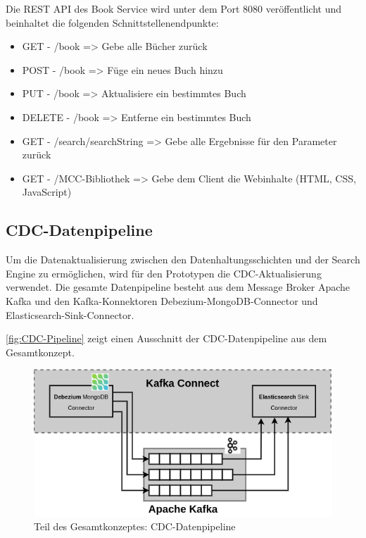 Die REST API des Book Service wird unter dem Port 8080 veröffentlicht und beinhaltet die folgenden Schnittstellenendpunkte:

\begin{itemize}
    \item GET - \glqq /book\grqq{} => Gebe alle Bücher zurück
    \item POST - \glqq /book\grqq{} => Füge ein neues Buch hinzu
    \item PUT - \glqq /book\grqq{} => Aktualisiere ein bestimmtes Buch
    \item DELETE - \glqq /book\grqq{} => Entferne ein bestimmtes Buch
    \item GET - \glqq /search/{searchString}\grqq{} => Gebe alle Ergebnisse für den Parameter zurück
    \item GET - \glqq /MCC-Bibliothek\grqq{} => Gebe dem Client die Webinhalte (HTML, CSS, JavaScript)
\end{itemize}

\subsection{CDC-Datenpipeline\label{sec5.2.2:Unterunterpunkt-2}}

Um die Datenaktualisierung zwischen den Datenhaltungsschichten und der Search Engine zu ermöglichen, wird für den Prototypen die CDC-Aktualisierung verwendet. Die gesamte Datenpipeline besteht aus dem Message Broker \glqq Apache Kafka\grqq{} und den Kafka-Konnektoren \glqq Debezium-MongoDB-Connector\grqq{} und \glqq Elasticsearch-Sink-Connector\grqq{}.

\autoref{fig:CDC-Pipeline} zeigt einen Ausschnitt der CDC-Datenpipeline aus dem Gesamtkonzept.

\begin{figure}[H]
    \centering
    \includegraphics[width=0.7\linewidth]{images/CDC-Pipeline.png}
    \caption{Teil des Gesamtkonzeptes: CDC-Datenpipeline}
    \label{fig:CDC-Pipeline}
\end{figure}

